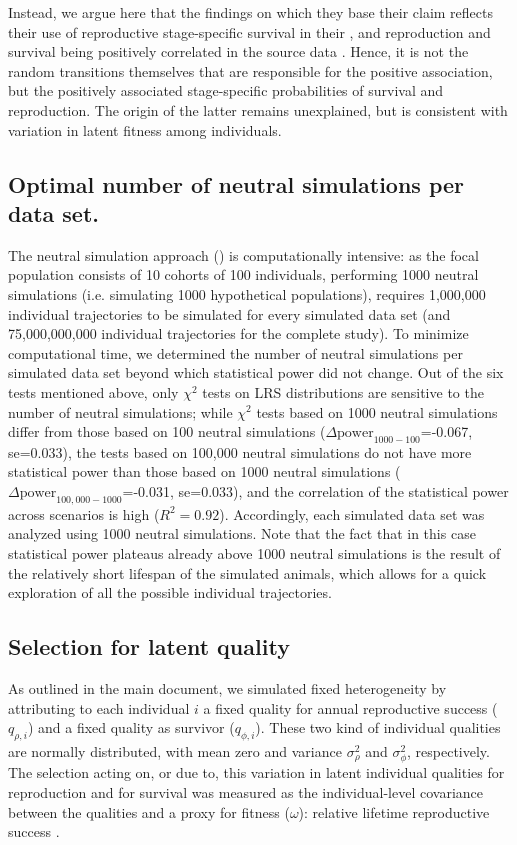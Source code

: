 Instead, we argue here that the findings on which they base their claim reflects their use of reproductive stage-specific survival in their \NSM, and reproduction and survival being positively correlated in the source data \parencite{Cam2002}. Hence, it is not the random transitions themselves that are responsible for the positive association, but the positively associated stage-specific probabilities of survival and reproduction. The origin of the latter remains unexplained, but is consistent with variation in latent fitness among individuals.

\subsection{Optimal number of neutral simulations per data set.}\label{ap:opnum}
The neutral simulation approach (\NSM) is computationally intensive: as the focal population consists of 10 cohorts of 100 individuals, performing 1000 neutral simulations (i.e. simulating 1000 hypothetical populations), requires 1,000,000 individual trajectories to be simulated for every simulated data set (and 75,000,000,000 individual trajectories for the complete study). To minimize computational time, we determined the number of neutral simulations per simulated data set beyond which statistical power did not change. Out of the six tests mentioned above, only $\chi^2$ tests on LRS distributions are sensitive to the number of neutral simulations; while $\chi^2$ tests based on 1000 neutral simulations differ from those based on 100 neutral simulations ($\Delta \mathrm{power}_{1000-100}$=-0.067, se=0.033), the tests based on 100,000 neutral simulations do not have more statistical power than those based on 1000 neutral simulations ($\Delta \mathrm{power}_{100,000-1000}$=-0.031, se=0.033), and the correlation of the statistical power across scenarios is high ($R^2=0.92$).
Accordingly, each simulated data set was analyzed using 1000 neutral simulations. Note that the fact that in this case statistical power plateaus already above 1000 neutral simulations is the result of the relatively short lifespan of the simulated animals, which allows for a quick exploration of all the possible individual trajectories. 

\subsection{Selection for latent quality}\label{ap:sel}

As outlined in the main document, we simulated fixed heterogeneity by attributing to each individual $i$ a fixed quality for annual reproductive success ($q_{\rho, i}$) and a fixed quality as survivor ($q_{\phi,i}$). These two kind of individual qualities are normally distributed, with mean zero and variance $\sigma_{\rho}^2$ and $\sigma_{\phi}^2$, respectively. The selection acting on, or due to, this variation in latent individual qualities for reproduction and for survival was measured as the individual-level covariance between the qualities and a proxy for fitness ($\omega$): relative lifetime reproductive success \parencite{Robertson1966}.

